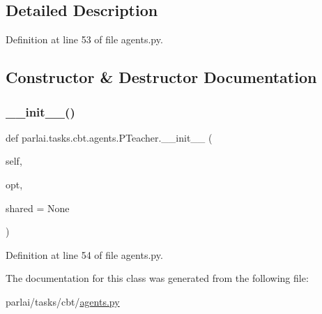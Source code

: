 \subsection{Detailed Description}


Definition at line 53 of file agents.\+py.



\subsection{Constructor \& Destructor Documentation}
\mbox{\label{classparlai_1_1tasks_1_1cbt_1_1agents_1_1PTeacher_a8433c2ae6d5202b4646baa3db9fbeb38}} 
\subsubsection{\texorpdfstring{\+\_\+\+\_\+init\+\_\+\+\_\+()}{\_\_init\_\_()}}
{\footnotesize\ttfamily def parlai.\+tasks.\+cbt.\+agents.\+P\+Teacher.\+\_\+\+\_\+init\+\_\+\+\_\+ (\begin{DoxyParamCaption}\item[{}]{self,  }\item[{}]{opt,  }\item[{}]{shared = {\ttfamily None} }\end{DoxyParamCaption})}



Definition at line 54 of file agents.\+py.



The documentation for this class was generated from the following file\+:\begin{DoxyCompactItemize}
\item 
parlai/tasks/cbt/\hyperlink{parlai_2tasks_2cbt_2agents_8py}{agents.\+py}\end{DoxyCompactItemize}

